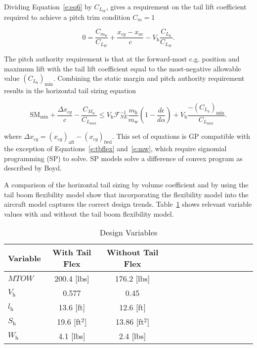 \documentclass[]{aiaa-tc}%
\begin{document}
Dividing Equation~\eqref{e:eq6} by $C_{L_W}$, gives a requirement on the tail lift coefficient required to achieve a pitch trim condition $C_m=1$

\begin{equation}
    0 = \frac{C_{m_{\text{w}}}}{C_{L_W}} + \frac{x_{cg} - x_{ac}}{c} - V_{\text{h}} \frac{C_{L_{\text{h}}}}{C_{L_W}}.
\end{equation}

The pitch authority requirement is that at the forward-most c.g. position and maximum lift with the tail lift coefficient equal to the most-negative allowable value $(C_{L_{\text{h}}})_{\text{min}}$. Combining the static margin and pitch authority requirement results in the horizontal tail sizing equation 

\begin{equation}
    \label{e:tbflex}
    \text{SM}_{\text{min}} + \frac{\Delta x_{cg}}{c} - \frac{C_{M_{\text{w}}}}{C_{L_{\text{max}}}} \leq V_{\text{h}} \mathcal{F}_{NE}^{-1} \frac{m_{\text{h}}}{m_{\text{w}}} \left( 1 - \frac{d\epsilon}{d\alpha}\right) + V_{\text{h}} \frac{-(C_{L_{\text{h}}})_{\text{min}}}{C_{L_{\text{max}}}}.
\end{equation}

where $\Delta x_{cg} = (x_{cg})_{\text{aft}} - (x_{cg})_{\text{fwd}}$. 
This set of equations is GP compatible with the exception of Equations~\ref{e:tbflex} and~\ref{e:mw}, which require signomial programming (SP) to solve.  
SP models solve a difference of convex program as described by Boyd.\cite{gp}

A comparison of the horizontal tail sizing by volume coefficient and by using the tail boom flexibility model show that incorporating the flexibility model into the aircraft model captures the correct design trends.  
Table~\ref{t:tbflex} shows relevant variable values with and without the tail boom flexibility model.  

\begin{longtable}{lccccccccccccc}
    \caption{Design Variables}\\
    \toprule
    \toprule
    \label{t:tbflex}
    Variable           & With Tail Flex     & Without Tail Flex \\ \hline
    $MTOW$             & 200.4 [lbs]        & 176.2 [lbs]       \\
    $V_{\mathrm{h}}$   & 0.577              & 0.45              \\
    $l_{\mathrm{h}}$   & 13.6 [ft]          & 12.6 [ft]         \\
    $S_{\mathrm{h}}$   & 19.6 [ft$^2$]      & 13.86 [ft$^2$]    \\
    $W_{\mathrm{h}}$   & 4.1 [lbs]          & 2.4 [lbs]         \\
    \bottomrule
\end{longtable}
\end{document}

